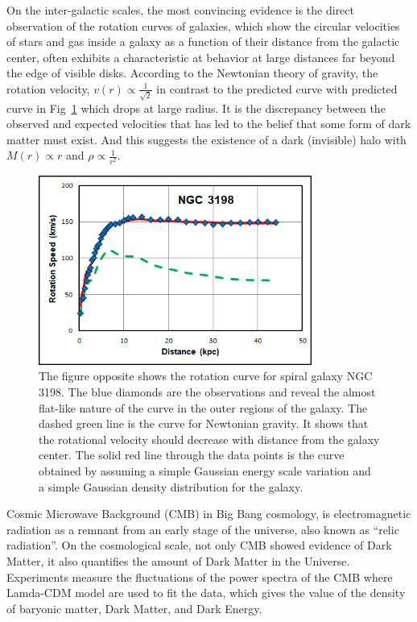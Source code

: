 \par On the inter-galactic scales, the most convincing evidence is the direct observation of the rotation curves of galaxies, which show the circular velocities of stars and gas inside a galaxy as a function of their distance from the galactic center, often exhibits a characteristic at behavior at large distances far beyond the edge of visible disks. According to the Newtonian theory of gravity, the rotation velocity, $v(r) \propto \frac{1}{\sqrt{2}}$ in contrast to the predicted curve with predicted curve in Fig~\ref{fig:rotation} which drops at large radius. It is the discrepancy between the observed and expected velocities that has led to the belief that some form of dark matter must exist. And this suggests the existence of a dark (invisible) halo with $M(r) \propto r$ and $\rho \propto \frac{1}{r^2}$.

\begin{figure}[htbp]
  \begin{center}
    \includegraphics[width=0.8\textwidth]{chapters/c2/figures/ngc3198_sparc.jpg}
  \end{center}
  \caption{The figure opposite shows the rotation curve for spiral galaxy NGC 3198. The blue diamonds are the observations and reveal the almost flat-like nature of the curve in the outer regions of the galaxy. The dashed green line is the curve for Newtonian gravity. It shows that the rotational velocity should decrease with distance from the galaxy center. The solid red line through the data points is the curve obtained by assuming a simple Gaussian energy scale variation and a simple Gaussian density distribution for the galaxy.}
  \label{fig:rotation}
\end{figure}

\par Cosmic Microwave Background (CMB) in Big Bang cosmology, is electromagnetic radiation as a remnant from an early stage of the universe, also known as ``relic radiation''. On the cosmological scale, not only CMB showed evidence of Dark Matter, it also quantifies the amount of Dark Matter in the Universe. Experiments measure the fluctuations of the power spectra of the CMB where Lamda-CDM model are used to fit the data, which gives the value of the density of baryonic matter, Dark Matter, and Dark Energy.

